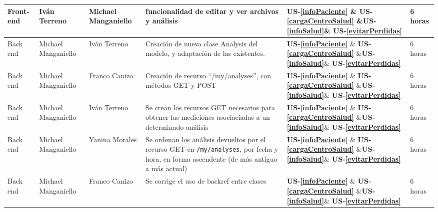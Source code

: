 {\begin{center}
{\begin{tabular}{|l|p{3cm}|l|p{6cm}|p{2cm}|p{1cm}|}
				       
				Front-end& Iván Terreno& Michael Manganiello &  funcionalidad de editar y ver archivos y análisis &\textbf{US-\ref{infoPaciente}} \& \textbf{US-\ref{cargaCentroSalud}} \&\textbf{US-\ref{infoSalud}}\& \textbf{US-\ref{evitarPerdidas} } 
				 & 6 horas
				\\ \hline
				
				
				Back end& Michael Manganiello & Iván Terreno& Creación de nueva clase Analysis del modelo, y adaptación de las existentes. &
				\textbf{US-\ref{infoPaciente}} \& \textbf{US-\ref{cargaCentroSalud}} \&\textbf{US-\ref{infoSalud}}\& \textbf{US-\ref{evitarPerdidas} } 
				 & 6 horas
				\\ \hline
				
				
				
				Back end& Michael Manganiello & Franco Canizo& Creación de recurso ``/my/analyses'', con métodos GET y POST & \textbf{US-\ref{infoPaciente}} \& \textbf{US-\ref{cargaCentroSalud}} \&\textbf{US-\ref{infoSalud}}\& \textbf{US-\ref{evitarPerdidas} } 
				& 6 horas
				\\ \hline   
				
				      
				Back end& Michael Manganiello & Iván Terreno& Se crean los recursos GET necesarios para obtener las mediciones asociaciadas a un determinado análisis & \textbf{US-\ref{infoPaciente}} \& \textbf{US-\ref{cargaCentroSalud}} \&\textbf{US-\ref{infoSalud}}\& \textbf{US-\ref{evitarPerdidas} } 
				& 6 horas
				\\ \hline   
				     
				      
				      
				Back end& Michael Manganiello& Yanina Morales & Se ordenan los análisis devueltos por el recurso GET en \texttt{/my/analyses}, por fecha y hora, en forma ascendente (de más antiguo a más actual) & \textbf{US-\ref{infoPaciente}} \& \textbf{US-\ref{cargaCentroSalud}} \&\textbf{US-\ref{infoSalud}}\& \textbf{US-\ref{evitarPerdidas} } 
				 & 6 horas
				\\ \hline 
				
				
				Back end& Michael Manganiello& Franco Canizo & Se corrige el uso de backref entre clases & \textbf{US-\ref{infoPaciente}} \& \textbf{US-\ref{cargaCentroSalud}} \&\textbf{US-\ref{infoSalud}}\& \textbf{US-\ref{evitarPerdidas} } 
				& 6 horas
				\\ \hline
				
				
			\end{tabular}
		}
	\end{center}
}

